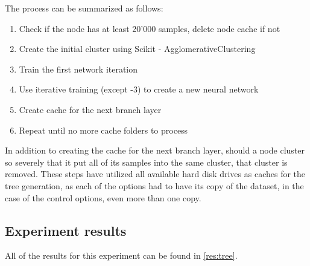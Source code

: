 The process can be summarized as follows:
\begin{enumerate}
    \item Check if the node has at least 20'000 samples, delete node cache if not
    \item Create the initial cluster using Scikit - AgglomerativeClustering
    \item Train the first network iteration
    \item Use iterative training (except -3) to create a new neural network
    \item Create cache for the next branch layer
    \item Repeat until no more cache folders to process
\end{enumerate}

In addition to creating the cache for the next branch layer, should a node cluster so severely that it put all of its samples into the same cluster, that cluster is removed.
These steps have utilized all available hard disk drives as caches for the tree generation, as each of the options had to have its copy of the dataset, in the case of the control options, even more than one copy.



\subsection{Experiment results}
All of the results for this experiment can be found in \cref{res:tree}.
